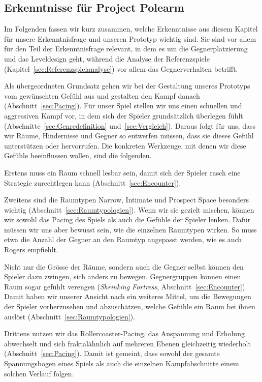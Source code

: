 \documentclass[../Main.tex]{subfiles}
\begin{document}
\subsection{Erkenntnisse für Project Polearm} \label{sec:ZwischenfazitLD}

Im Folgenden fassen wir kurz zusammen, welche Erkenntnisse aus diesem Kapitel für unsere Erkenntnisfrage und unseren Prototyp wichtig sind. Sie sind vor allem für den Teil der Erkenntnisfrage relevant, in dem es um die Gegnerplatzierung und das Leveldesign geht, während die Analyse der Referenzspiele (Kapitel~\ref{sec:Referenzspielanalyse}) vor allem das Gegnerverhalten betrifft.

Als übergeordneten Grundsatz gehen wir bei der Gestaltung unseres Prototyps vom gewünschten Gefühl aus und gestalten den Kampf danach (Abschnitt~\ref{sec:Pacing}). Für unser Spiel stellen wir uns einen schnellen und aggressiven Kampf vor, in dem sich der Spieler grundsätzlich überlegen fühlt (Abschnitte~\ref{sec:Genredefinition} und~\ref{sec:Vergleich}). Daraus folgt für uns, dass wir Räume, Hindernisse und Gegner so entwerfen müssen, dass sie dieses Gefühl unterstützen oder hervorrufen. Die konkreten Werkzeuge, mit denen wir diese Gefühle beeinflussen wollen, sind die folgenden.

Erstens muss ein Raum schnell lesbar sein, damit sich der Spieler rasch eine Strategie zurechtlegen kann (Abschnitt~\ref{sec:Encounter}).

Zweitens sind die Raumtypen Narrow, Intimate und Prospect Space besonders wichtig (Abschnitt~\ref{sec:Raumtypologien}). Wenn wir sie gezielt mischen, können wir sowohl das Pacing des Spiels als auch die Gefühle der Spieler lenken. Dafür müssen wir uns aber bewusst sein, wie die einzelnen Raumtypen wirken. So muss etwa die Anzahl der Gegner an den Raumtyp angepasst werden, wie es auch Rogers empfiehlt.\textcolor{red}{\autocite[245]{rogers2014levelup}}

Nicht nur die Grösse der Räume, sondern auch die Gegner selbst können den Spieler dazu zwingen, sich anders zu bewegen. Gegnergruppen können einen Raum sogar gefühlt verengen (\textit{Shrinking Fortress}, Abschnitt~\ref{sec:Encounter}). Damit haben wir unserer Ansicht nach ein weiteres Mittel, um die Bewegungen der Spieler vorherzusehen und abzuschätzen, welche Gefühle ein Raum bei ihnen auslöst (Abschnitt~\ref{sec:Raumtypologien}).

Drittens nutzen wir das Rollercoaster-Pacing, das Anspannung und Erholung abwechselt und sich fraktalähnlich auf mehreren Ebenen gleichzeitig wiederholt (Abschnitt~\ref{sec:Pacing}). Damit ist gemeint, dass sowohl der gesamte Spannungsbogen eines Spiels als auch die einzelnen Kampfabschnitte einem solchen Verlauf folgen.
\end{document}
